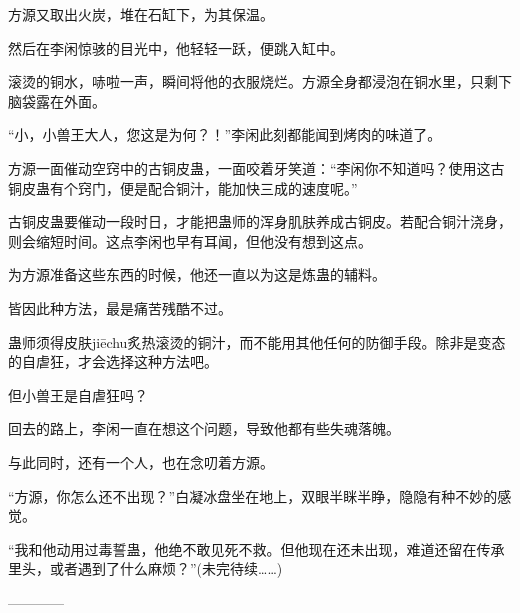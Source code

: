 \begin{this_body}
方源又取出火炭，堆在石缸下，为其保温。

然后在李闲惊骇的目光中，他轻轻一跃，便跳入缸中。

滚烫的铜水，哧啦一声，瞬间将他的衣服烧烂。方源全身都浸泡在铜水里，只剩下脑袋露在外面。

“小，小兽王大人，您这是为何？！”李闲此刻都能闻到烤肉的味道了。

方源一面催动空窍中的古铜皮蛊，一面咬着牙笑道：“李闲你不知道吗？使用这古铜皮蛊有个窍门，便是配合铜汁，能加快三成的速度呢。”

古铜皮蛊要催动一段时日，才能把蛊师的浑身肌肤养成古铜皮。若配合铜汁浇身，则会缩短时间。这点李闲也早有耳闻，但他没有想到这点。

为方源准备这些东西的时候，他还一直以为这是炼蛊的辅料。

皆因此种方法，最是痛苦残酷不过。

蛊师须得皮肤jiēchu炙热滚烫的铜汁，而不能用其他任何的防御手段。除非是变态的自虐狂，才会选择这种方法吧。

但小兽王是自虐狂吗？

回去的路上，李闲一直在想这个问题，导致他都有些失魂落魄。

与此同时，还有一个人，也在念叨着方源。

“方源，你怎么还不出现？”白凝冰盘坐在地上，双眼半眯半睁，隐隐有种不妙的感觉。

“我和他动用过毒誓蛊，他绝不敢见死不救。但他现在还未出现，难道还留在传承里头，或者遇到了什么麻烦？”(未完待续……)

------------

\end{this_body}

